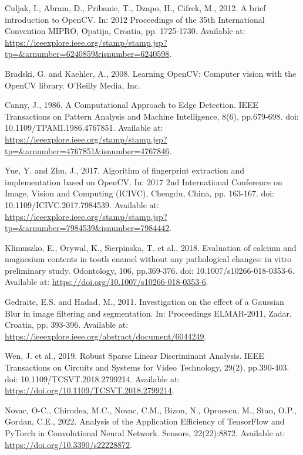 \begin{thebibliography}{99}
    Culjak, I., Abram, D., Pribanic, T., Dzapo, H., Cifrek, M., 2012. A brief introduction to OpenCV. In: 2012 Proceedings of the 35th International Convention MIPRO, Opatija, Croatia, pp. 1725-1730. Available at: \url{https://ieeexplore.ieee.org/stamp/stamp.jsp?tp=&arnumber=6240859&isnumber=6240598}.

    Bradski, G. and Kaehler, A., 2008. Learning OpenCV: Computer vision with the OpenCV library. O'Reilly Media, Inc.

    Canny, J., 1986. A Computational Approach to Edge Detection. IEEE Transactions on Pattern Analysis and Machine Intelligence, 8(6), pp.679-698. doi: 10.1109/TPAMI.1986.4767851. Available at: \url{https://ieeexplore.ieee.org/stamp/stamp.jsp?tp=&arnumber=4767851&isnumber=4767846}.

    Yue, Y. and Zhu, J., 2017. Algorithm of fingerprint extraction and implementation based on OpenCV. In: 2017 2nd International Conference on Image, Vision and Computing (ICIVC), Chengdu, China, pp. 163-167. doi: 10.1109/ICIVC.2017.7984539. Available at: \url{https://ieeexplore.ieee.org/stamp/stamp.jsp?tp=&arnumber=7984539&isnumber=7984442}.

    Klimuszko, E., Orywal, K., Sierpinska, T. et al., 2018. Evaluation of calcium and magnesium contents in tooth enamel without any pathological changes: in vitro preliminary study. Odontology, 106, pp.369-376. doi: 10.1007/s10266-018-0353-6. Available at: \url{https://doi.org/10.1007/s10266-018-0353-6}.

    Gedraite, E.S. and Hadad, M., 2011. Investigation on the effect of a Gaussian Blur in image filtering and segmentation. In: Proceedings ELMAR-2011, Zadar, Croatia, pp. 393-396. Available at: \url{https://ieeexplore.ieee.org/abstract/document/6044249}.

    Wen, J. et al., 2019. Robust Sparse Linear Discriminant Analysis. IEEE Transactions on Circuits and Systems for Video Technology, 29(2), pp.390-403. doi: 10.1109/TCSVT.2018.2799214. Available at: \url{https://doi.org/10.1109/TCSVT.2018.2799214}.

    Novac, O-C., Chirodea, M.C., Novac, C.M., Bizon, N., Oproescu, M., Stan, O.P., Gordan, C.E., 2022. Analysis of the Application Efficiency of TensorFlow and PyTorch in Convolutional Neural Network. Sensors, 22(22):8872. Available at: \url{https://doi.org/10.3390/s22228872}.


\end{thebibliography}
